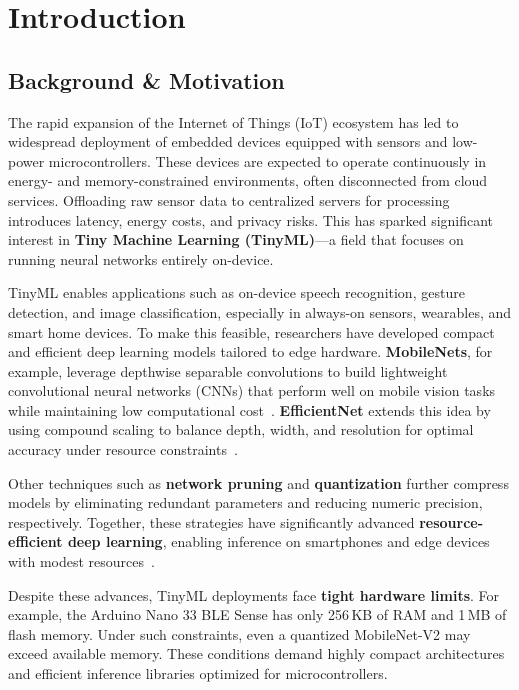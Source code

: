 \chapter{Introduction}

\section{Background \& Motivation}

The rapid expansion of the Internet of Things (IoT) ecosystem has led to widespread deployment of embedded devices equipped with sensors and low-power microcontrollers. These devices are expected to operate continuously in energy- and memory-constrained environments, often disconnected from cloud services. Offloading raw sensor data to centralized servers for processing introduces latency, energy costs, and privacy risks. This has sparked significant interest in \textbf{Tiny Machine Learning (TinyML)}—a field that focuses on running neural networks entirely on-device.

TinyML enables applications such as on-device speech recognition, gesture detection, and image classification, especially in always-on sensors, wearables, and smart home devices. To make this feasible, researchers have developed compact and efficient deep learning models tailored to edge hardware. \textbf{MobileNets}, for example, leverage depthwise separable convolutions to build lightweight convolutional neural networks (CNNs) that perform well on mobile vision tasks while maintaining low computational cost~\cite{ConvNetworksMobileNets}. \textbf{EfficientNet} extends this idea by using compound scaling to balance depth, width, and resolution for optimal accuracy under resource constraints~\cite{tan2019efficientnet}.

Other techniques such as \textbf{network pruning} and \textbf{quantization} further compress models by eliminating redundant parameters and reducing numeric precision, respectively. Together, these strategies have significantly advanced \textbf{resource-efficient deep learning}, enabling inference on smartphones and edge devices with modest resources~\cite{alajlan2022tinyml}.

Despite these advances, TinyML deployments face \textbf{tight hardware limits}. For example, the Arduino Nano 33 BLE Sense has only 256\,KB of RAM and 1\,MB of flash memory. Under such constraints, even a quantized MobileNet-V2 may exceed available memory. These conditions demand highly compact architectures and efficient inference libraries optimized for microcontrollers.

